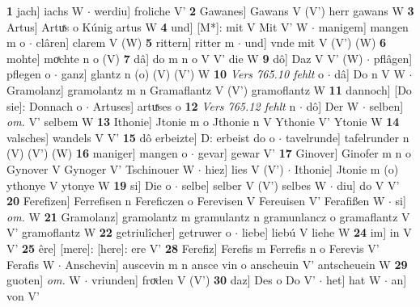 \documentclass[8pt,a4paper,notitlepage]{article}
\begin{document}
\begin{table}[ht]
\begin{minipage}[t]{0.5\linewidth}
\textbf{1} jach] iachs W  $\cdot$ werdiu] froliche V' \textbf{2} Gawanes] Gawans V (V') herr gawans W \textbf{3} Artus] Artuͯs o Kúnig artus W \textbf{4} und] [M*]: mit V Mit V' W  $\cdot$ manigem] mangen m o  $\cdot$ clâren] clarem V (W) \textbf{5} rittern] ritter m  $\cdot$ und] vnde mit V (V') (W) \textbf{6} mohte] moͯchte n o (V) \textbf{7} dâ] do m n o V V' die W \textbf{9} dô] Daz V V' (W)  $\cdot$ pflâgen] pflegen o  $\cdot$ ganz] glantz n (o) (V) (V') W \textbf{10} \textit{Vers 765.10 fehlt} o   $\cdot$ dâ] Do n V W  $\cdot$ Gramolanz] gramolantz m n Gramaflantz V (V') gramoflantz W \textbf{11} dannoch] [Do sie]: Donnach o  $\cdot$ Artuses] artuͯses o \textbf{12} \textit{Vers 765.12 fehlt} n   $\cdot$ dô] Der W  $\cdot$ selben] \textit{om.} V' selbem W \textbf{13} Ithonie] Jtonie m o Jthonie n V Ythonie V' Ytonie W \textbf{14} valsches] wandels V V' \textbf{15} dô erbeizte] D: erbeist do o  $\cdot$ tavelrunde] tafelrunder n (V) (V') (W) \textbf{16} maniger] mangen o  $\cdot$ gevar] gewar V' \textbf{17} Ginover] Ginofer m n o Gynover V Gynoger V' Tschinouer W  $\cdot$ hiez] lies V (V')  $\cdot$ Ithonie] Jtonie m (o) ythonye V ytonye W \textbf{19} si] Die o  $\cdot$ selbe] selber V (V') selbes W  $\cdot$ diu] do V V' \textbf{20} Ferefizen] Ferrefisen n Fereficzen o Ferevisen V Fereuisen V' Ferafißen W  $\cdot$ si] \textit{om.} W \textbf{21} Gramolanz] gramolantz m gramulantz n gramunlancz o gramaflantz V V' gramoflantz W \textbf{22} getriulîcher] getruwer o  $\cdot$ liebe] liebú V liehe W \textbf{24} im] in V V' \textbf{25} êre] [mere]: [here]: ere V' \textbf{28} Ferefiz] Ferefis m Ferrefis n o Ferevis V' Ferafis W  $\cdot$ Anschevin] auscevin m n ansce vin o anscheuin V' antscheuein W \textbf{29} guoten] \textit{om.} W  $\cdot$ vriunden] froͮden V (V') \textbf{30} daz] Des o Do V'  $\cdot$ het] hat W  $\cdot$ an] von V' \newline
\end{minipage}
\end{table}
\newpage
\end{document}
